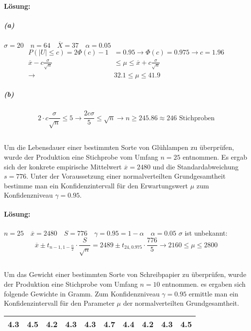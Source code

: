 \documentclass[ngerman]{scrartcl}
\begin{document}
\paragraph{Lösung:}
\subparagraph{(a)}
$\sigma = 20 \quad n =64\quad \overline{X} = 37\quad \alpha=0.05$
\begin{align*}
P(|U| \le c) = 2\Phi(c)-1 &= 0.95 \rightarrow \Phi(c) = 0.975\rightarrow c = 1.96\\
\overline{x} - c\frac{\sigma}{\sqrt{n}} &\le \mu \le \overline{x} + c\frac{\sigma}{\sqrt{n}}\\
\rightarrow & 32.1 \le \mu \le 41.9
\end{align*}
\subparagraph{(b)}
\begin{equation*}
2\cdot c\frac{\sigma}{\sqrt{n}} \le 5 \rightarrow \frac{2c\sigma}{5} \le \sqrt{n}\rightarrow n \geq 245.86 \approx 246\text{ Stichproben}
\end{equation*}
\subsection{}
Um die Lebensdauer einer bestimmten Sorte von Glühlampen zu überprüfen, wurde der Produktion eine Stichprobe vom Umfang $n=25$ entnommen. Es ergab sich der konkrete empirische Mittelwert $\overline{x} = 2480$ und die Standardabweichung $s=776$. Unter der Voraussetzung einer normalverteilten Grundgesamtheit bestimme man ein Konfidenzintervall für den Erwartungswert $\mu$ zum Konfidenzniveau $\gamma =0.95$. 
\paragraph{Lösung:}
$n=25\quad \overline{x} =2480\quad S=776\quad \gamma=0.95=1-\alpha\quad \alpha = 0.05$ $\sigma$ ist unbekannt:
\begin{equation*}
\overline{x} \pm t_{n-1,1-\frac{\alpha}{2}}\cdot\frac{S}{\sqrt{n}} = 2489 \pm t_{24,0.975}\cdot\frac{776}{5}\rightarrow 2160\leq \mu \leq 2800
\end{equation*}
\subsection{}
Um das Gewicht einer bestimmten Sorte von Schreibpapier zu überprüfen, wurde der Produktion eine Stichprobe vom Umfang $n=10$ entnommen. es ergaben sich folgende Gewichte in Gramm. Zum Konfidenzniveau $\gamma = 0.95$ ermittle man ein Konfidenzintervall für den Parameter $\mu$ der normalverteilten Grundgesamtheit.\\
\begin{tabular}{c c c c c c c c c c}\hline
4.3& 4.5& 4.2& 4.3& 4.3& 4.7 & 4.4& 4.2& 4.3& 4.5\\\hline
\end{tabular}
\end{document}
